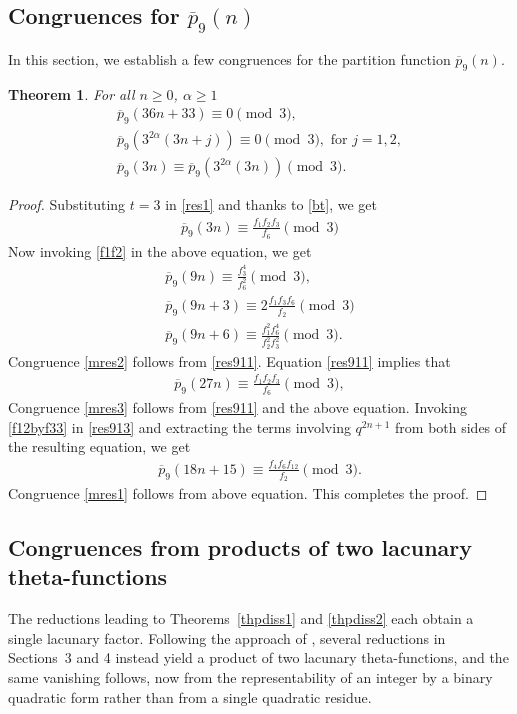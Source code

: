 \documentclass[11pt, reqno]{amsart}
\newtheorem{theorem}{Theorem}[section]
\numberwithin{equation}{section}
\begin{document}
	\subsection{Congruences for $\overline{p}_{9}(n)$}
	In this section, we establish a few congruences for the partition function $\overline{p}_{9}(n)$.
	\begin{theorem}For all $n\geq0$, $\alpha\geq1$
		\begin{align}\overline{p}_{9}(36n+33)\equiv0 \pmod{3},\label{mres1}\\
			\overline{p}_{9}(3^{2\alpha}(3
			n+j))\equiv0 \pmod{3},\,\,\text{for}\,\,j=1,2,\label{mres2}\\
			\overline{p}_{9}(3
			n)\equiv\overline{p}_{9}(3^{2\alpha}(3n)) \pmod{3}.\label{mres3}
		\end{align}
	\end{theorem}
	\begin{proof}
		Substituting $t=3$ in \eqref{res1} and thanks to \eqref{bt}, we get
		\begin{align}
			\overline{p}_{9}(3n)\equiv\frac{f_{1}f_2f_3}{f_{6}}\pmod{3}\label{res91}
		\end{align}
		Now invoking \eqref{f1f2} in the above equation, we get
		\begin{align}
			\overline{p}_{9}(9n)\equiv\frac{f_{3}^4}{f_{6}^2}\pmod{3},\label{res911}\\
			\overline{p}_{9}(9n+3)\equiv2\frac{f_1f_{3}f_6}{f_2}\pmod{3}\label{res912}\\
			\overline{p}_{9}(9n+6)\equiv\frac{f_1^2f_6^4}{f_2^2f_3^2}\pmod{3}.\label{res913}
		\end{align}
		Congruence \eqref{mres2} follows from \eqref{res911}. Equation \eqref{res911} implies that 
		\begin{align}
			\overline{p}_{9}(27n)\equiv\frac{f_1f_2f_3}{f_{6}}\pmod{3},\label{res914}
		\end{align}
		Congruence \eqref{mres3} follows from \eqref{res911} and the above equation. Invoking \eqref{f12byf33} in \eqref{res913} and extracting the terms involving $q^{2n+1}$ from both sides of the resulting equation, we get
		\begin{align}
			\overline{p}_{9}(18n+15)\equiv\frac{f_4f_6f_{12}}{f_2}\pmod{3}.\label{res915}
		\end{align}
		Congruence \eqref{mres1} follows from above equation. This completes the proof.   
	\end{proof}
	
	\subsection{Congruences from products of two lacunary theta-functions}
	The reductions leading to Theorems~\ref{thpdiss1} and \ref{thpdiss2} each
	obtain a single lacunary factor. Following the approach of \cite{Chen2023},
	several reductions in Sections~3 and 4 instead yield a product of two
	lacunary theta-functions, and the same vanishing follows, now from the
	representability of an integer by a binary quadratic form rather than from
	a single quadratic residue.
	
\end{document}
